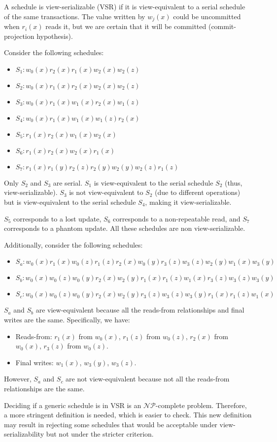 A schedule is view-serializable (VSR) if it is view-equivalent to a serial schedule of the same transactions. 
The value written by $w_j(x)$ could be uncommitted when $r_i(x)$ reads it, but we are certain that it will be committed (commit-projection hypothesis).
\begin{example}
    Consider the following schedules:
    \begin{itemize}
        \item $S_1: w_0(x) r_2(x) r_1(x) w_2(x) w_2(z)$
        \item $S_2: w_0(x) r_1(x) r_2(x) w_2(x) w_2(z)$
        \item $S_3: w_0(x) r_1(x) w_1(x) r_2(x) w_1(z)$
        \item $S_4: w_0(x) r_1(x) w_1(x) w_1(z) r_2(x)$
        \item $S_5: r_1(x) r_2(x) w_1(x) w_2(x)$
        \item $S_6: r_1(x) r_2(x) w_2(x) r_1(x)$
        \item $S_7: r_1(x) r_1(y) r_2(z) r_2(y) w_2(y) w_2(z) r_1(z)$
    \end{itemize}
    Only $S_2$ and $S_3$ are serial.
    $S_1$ is view-equivalent to the serial schedule $S_2$ (thus, view-serializable). 
    $S_3$ is not view-equivalent to $S_2$ (due to different operations) but is view-equivalent to the serial schedule $S_4$, making it view-serializable.

    $S_5$ corresponds to a lost update, $S_6$ corresponds to a non-repeatable read, and $S_7$ corresponds to a phantom update. All these schedules are non view-serializable. 
    
    Additionally, consider the following schedules:
    \begin{itemize}
        \item $S_a: w_0(x) r_1(x) w_0(z) r_1(z) r_2(x) w_0(y) r_3(z) w_3(z) w_2(y) w_1(x) w_3(y)$
        \item $S_b: w_0(x) w_0(z) w_0(y) r_2(x) w_2(y) r_1(x) r_1(z) w_1(x) r_3(z) w_3(z) w_3(y)$
        \item $S_c: w_0(x) w_0(z) w_0(y) r_2(x) w_2(y) r_3(z) w_3(z) w_3(y) r_1(x) r_1(z) w_1(x)$
    \end{itemize}
    $S_a$ and $S_b$ are view-equivalent because all the reads-from relationships and final writes are the same. 
    Specifically, we have: 
    \begin{itemize}
        \item Reads-from: $r_1(x)$ from $w_0(x)$, $r_1(z)$ from $w_0(z)$, $r_2(x)$ from $w_0(x)$, $r_3(z)$ from $w_0(z)$.
        \item Final writes: $w_1(x)$, $w_3(y)$, $w_3(z)$.
    \end{itemize}
    However, $S_a$ and $S_c$ are not view-equivalent because not all the reads-from relationships are the same.
\end{example}
Deciding if a generic schedule is in VSR is an $\mathcal{NP}$-complete problem. 
Therefore, a more stringent definition is needed, which is easier to check.
This new definition may result in rejecting some schedules that would be acceptable under view-serializability but not under the stricter criterion.